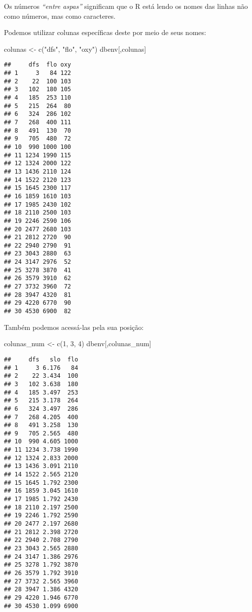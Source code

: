 \documentclass[
]{book}
\newenvironment{Shaded}{\begin{snugshade}}{\end{snugshade}}
\newcommand{\DecValTok}[1]{\textcolor[rgb]{0.00,0.00,0.81}{#1}}
\newcommand{\FunctionTok}[1]{\textcolor[rgb]{0.00,0.00,0.00}{#1}}
\newcommand{\NormalTok}[1]{#1}
\newcommand{\OtherTok}[1]{\textcolor[rgb]{0.56,0.35,0.01}{#1}}
\newcommand{\StringTok}[1]{\textcolor[rgb]{0.31,0.60,0.02}{#1}}
\begin{document}
Os números \emph{``entre aspas''} significam que o R está lendo os nomes das linhas não como números, mas como caracteres.

Podemos utilizar colunas específicas deste por meio de seus nomes:

\begin{Shaded}
\begin{Highlighting}[]
\NormalTok{colunas }\OtherTok{\textless{}{-}} \FunctionTok{c}\NormalTok{(}\StringTok{"dfs"}\NormalTok{, }\StringTok{"flo"}\NormalTok{, }\StringTok{"oxy"}\NormalTok{)}
\NormalTok{dbenv[,colunas]}
\end{Highlighting}
\end{Shaded}

\begin{verbatim}
##     dfs  flo oxy
## 1     3   84 122
## 2    22  100 103
## 3   102  180 105
## 4   185  253 110
## 5   215  264  80
## 6   324  286 102
## 7   268  400 111
## 8   491  130  70
## 9   705  480  72
## 10  990 1000 100
## 11 1234 1990 115
## 12 1324 2000 122
## 13 1436 2110 124
## 14 1522 2120 123
## 15 1645 2300 117
## 16 1859 1610 103
## 17 1985 2430 102
## 18 2110 2500 103
## 19 2246 2590 106
## 20 2477 2680 103
## 21 2812 2720  90
## 22 2940 2790  91
## 23 3043 2880  63
## 24 3147 2976  52
## 25 3278 3870  41
## 26 3579 3910  62
## 27 3732 3960  72
## 28 3947 4320  81
## 29 4220 6770  90
## 30 4530 6900  82
\end{verbatim}

Também podemos acessá-las pela sua posição:

\begin{Shaded}
\begin{Highlighting}[]
\NormalTok{colunas\_num }\OtherTok{\textless{}{-}} \FunctionTok{c}\NormalTok{(}\DecValTok{1}\NormalTok{, }\DecValTok{3}\NormalTok{, }\DecValTok{4}\NormalTok{)}
\NormalTok{dbenv[,colunas\_num]}
\end{Highlighting}
\end{Shaded}

\begin{verbatim}
##     dfs   slo  flo
## 1     3 6.176   84
## 2    22 3.434  100
## 3   102 3.638  180
## 4   185 3.497  253
## 5   215 3.178  264
## 6   324 3.497  286
## 7   268 4.205  400
## 8   491 3.258  130
## 9   705 2.565  480
## 10  990 4.605 1000
## 11 1234 3.738 1990
## 12 1324 2.833 2000
## 13 1436 3.091 2110
## 14 1522 2.565 2120
## 15 1645 1.792 2300
## 16 1859 3.045 1610
## 17 1985 1.792 2430
## 18 2110 2.197 2500
## 19 2246 1.792 2590
## 20 2477 2.197 2680
## 21 2812 2.398 2720
## 22 2940 2.708 2790
## 23 3043 2.565 2880
## 24 3147 1.386 2976
## 25 3278 1.792 3870
## 26 3579 1.792 3910
## 27 3732 2.565 3960
## 28 3947 1.386 4320
## 29 4220 1.946 6770
## 30 4530 1.099 6900
\end{verbatim}
\end{document}
